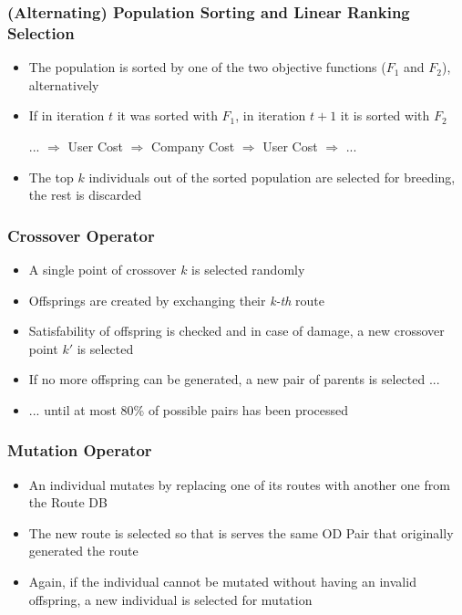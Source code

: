 \documentclass[dvipsnames]{beamer}
\begin{document}
\begin{frame}
  \frametitle{(Alternating) Population Sorting and Linear Ranking Selection}
  \begin{itemize}
    \item The population is sorted by one of the two objective functions ($F_1$ and $F_2$), alternatively
    \item If in iteration $t$ it was sorted with $F_1$, in iteration $t+1$ it is sorted with $F_2$
      \begin{center}
        ... $\Rightarrow$ User Cost $\Rightarrow$ Company Cost $\Rightarrow$ User Cost $\Rightarrow$ ...
      \end{center}
    \item The top $k$ individuals out of the sorted population are selected for breeding, the rest is discarded
  \end{itemize}
\end{frame}

\begin{frame}
  \frametitle{Crossover Operator}
  \begin{itemize}
    \item A single point of crossover $k$ is selected randomly
    \item Offsprings are created by exchanging their \textit{k-th} route
    \item Satisfability of offspring is checked and in case of damage, a new crossover point $k'$ is selected
    \item If no more offspring can be generated, a new pair of parents is selected ...
    \item ... until at most 80\% of possible pairs has been processed
  \end{itemize}
\end{frame}

\begin{frame}
  \frametitle{Mutation Operator}
  \begin{itemize}
    \item An individual mutates by replacing one of its routes with another one from the Route DB
    \item The new route is selected so that is serves the same OD Pair that originally generated the route
    \item Again, if the individual cannot be mutated without having an invalid offspring, a new individual is selected for mutation
  \end{itemize}
\end{frame}
\end{document}
